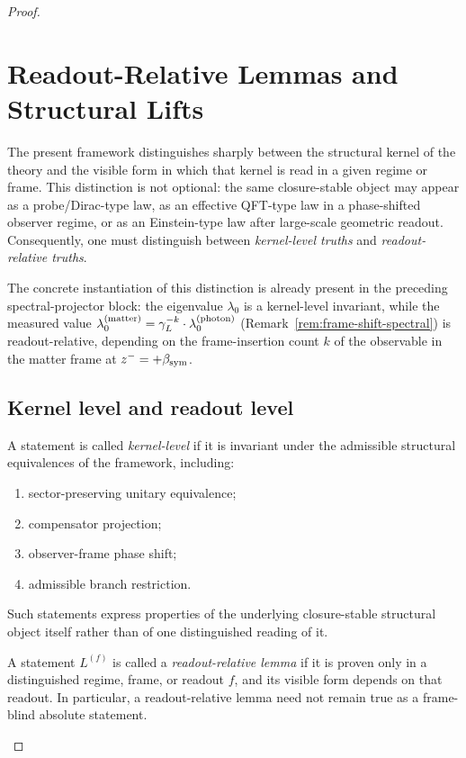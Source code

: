 \begin{proof}
\section{Readout-Relative Lemmas and Structural Lifts}
\label{sec:readout-relative-lemmas}

The present framework distinguishes sharply between the structural kernel
of the theory and the visible form in which that kernel is read in a
given regime or frame. This distinction is not optional: the same
closure-stable object may appear as a probe/Dirac-type law, as an
effective QFT-type law in a phase-shifted observer regime, or as an
Einstein-type law after large-scale geometric readout. Consequently,
one must distinguish between \emph{kernel-level truths} and
\emph{readout-relative truths}.

The concrete instantiation of this distinction is already present in the
preceding spectral-projector block: the eigenvalue $\lambda_0$ is a
kernel-level invariant, while the measured value
$\lambda_0^{(\mathrm{matter})} = \gamma_L^{-k}\cdot\lambda_0^{(\mathrm{photon})}$
(Remark~\ref{rem:frame-shift-spectral}) is readout-relative, depending
on the frame-insertion count $k$ of the observable in the matter frame
at $z^- = +\beta_{\mathrm{sym}}$.

\subsection*{Kernel level and readout level}

\begin{definition}
\label{def:kernel-level-statement}
A statement is called \emph{kernel-level} if it is invariant under the
admissible structural equivalences of the framework, including:
\begin{enumerate}[label=(\roman*)]
  \item sector-preserving unitary equivalence;
  \item compensator projection;
  \item observer-frame phase shift;
  \item admissible branch restriction.
\end{enumerate}
Such statements express properties of the underlying closure-stable
structural object itself rather than of one distinguished reading of it.
\end{definition}

\begin{definition}
\label{def:readout-relative-lemma}
A statement $L^{(f)}$ is called a \emph{readout-relative lemma} if it
is proven only in a distinguished regime, frame, or readout $f$, and its
visible form depends on that readout. In particular, a readout-relative
lemma need not remain true as a frame-blind absolute statement.
\end{definition}


\end{proof}
